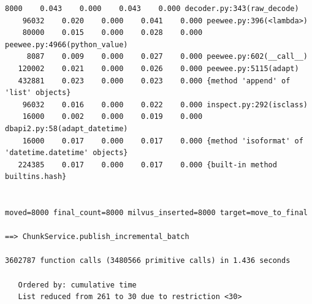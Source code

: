 \documentclass[a4paper,12pt]{article}
\begin{document}
\begin{lstlisting}[basicstyle=\ttfamily\fontsize{9}{9}\selectfont]
     8000    0.043    0.000    0.043    0.000 decoder.py:343(raw_decode)
    96032    0.020    0.000    0.041    0.000 peewee.py:396(<lambda>)
    80000    0.015    0.000    0.028    0.000 peewee.py:4966(python_value)
     8087    0.009    0.000    0.027    0.000 peewee.py:602(__call__)
   120002    0.021    0.000    0.026    0.000 peewee.py:5115(adapt)
   432881    0.023    0.000    0.023    0.000 {method 'append' of 'list' objects}
    96032    0.016    0.000    0.022    0.000 inspect.py:292(isclass)
    16000    0.002    0.000    0.019    0.000 dbapi2.py:58(adapt_datetime)
    16000    0.017    0.000    0.017    0.000 {method 'isoformat' of 'datetime.datetime' objects}
   224385    0.017    0.000    0.017    0.000 {built-in method builtins.hash}


moved=8000 final_count=8000 milvus_inserted=8000 target=move_to_final

==> ChunkService.publish_incremental_batch

3602787 function calls (3480566 primitive calls) in 1.436 seconds

   Ordered by: cumulative time
   List reduced from 261 to 30 due to restriction <30>


\end{lstlisting}
\end{document}
